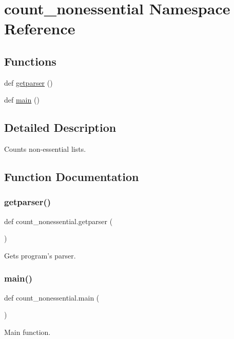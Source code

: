 \hypertarget{namespacecount__nonessential}{}\section{count\+\_\+nonessential Namespace Reference}
\label{namespacecount__nonessential}
\subsection*{Functions}
\begin{DoxyCompactItemize}
\item 
def \hyperlink{namespacecount__nonessential_acf5f19ac6953f2e0dfd7f932e567458e}{getparser} ()
\item 
def \hyperlink{namespacecount__nonessential_a7d61c7dbac71e1b280d7779e5fefaa45}{main} ()
\end{DoxyCompactItemize}


\subsection{Detailed Description}
\begin{DoxyVerb}Counts non-essential lists.\end{DoxyVerb}
 

\subsection{Function Documentation}
\mbox{\label{namespacecount__nonessential_acf5f19ac6953f2e0dfd7f932e567458e}} 
\subsubsection{\texorpdfstring{getparser()}{getparser()}}
{\footnotesize\ttfamily def count\+\_\+nonessential.\+getparser (\begin{DoxyParamCaption}{ }\end{DoxyParamCaption})}

\begin{DoxyVerb}Gets program's parser.\end{DoxyVerb}
 \mbox{\label{namespacecount__nonessential_a7d61c7dbac71e1b280d7779e5fefaa45}} 
\subsubsection{\texorpdfstring{main()}{main()}}
{\footnotesize\ttfamily def count\+\_\+nonessential.\+main (\begin{DoxyParamCaption}{ }\end{DoxyParamCaption})}

\begin{DoxyVerb}Main function.\end{DoxyVerb}
 